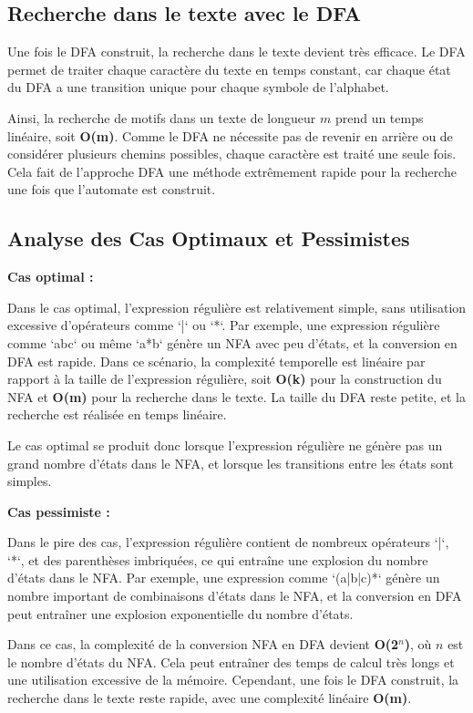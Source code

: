 \documentclass[11pt,english]{article}
\begin{document}
\subsection{Recherche dans le texte avec le DFA}

Une fois le DFA construit, la recherche dans le texte devient très efficace. Le DFA permet de traiter chaque caractère du texte en temps constant, car chaque état du DFA a une transition unique pour chaque symbole de l'alphabet.

Ainsi, la recherche de motifs dans un texte de longueur $m$ prend un temps linéaire, soit \textbf{O(m)}. Comme le DFA ne nécessite pas de revenir en arrière ou de considérer plusieurs chemins possibles, chaque caractère est traité une seule fois. Cela fait de l'approche DFA une méthode extrêmement rapide pour la recherche une fois que l'automate est construit.

\subsection{Analyse des Cas Optimaux et Pessimistes}

\textbf{Cas optimal :}

Dans le cas optimal, l'expression régulière est relativement simple, sans utilisation excessive d'opérateurs comme `|` ou `*`. Par exemple, une expression régulière comme `abc` ou même `a*b` génère un NFA avec peu d'états, et la conversion en DFA est rapide. Dans ce scénario, la complexité temporelle est linéaire par rapport à la taille de l'expression régulière, soit \textbf{O(k)} pour la construction du NFA et \textbf{O(m)} pour la recherche dans le texte. La taille du DFA reste petite, et la recherche est réalisée en temps linéaire.

Le cas optimal se produit donc lorsque l'expression régulière ne génère pas un grand nombre d'états dans le NFA, et lorsque les transitions entre les états sont simples.

\textbf{Cas pessimiste :}

Dans le pire des cas, l'expression régulière contient de nombreux opérateurs `|`, `*`, et des parenthèses imbriquées, ce qui entraîne une explosion du nombre d'états dans le NFA. Par exemple, une expression comme `(a|b|c)*` génère un nombre important de combinaisons d'états dans le NFA, et la conversion en DFA peut entraîner une explosion exponentielle du nombre d'états.

Dans ce cas, la complexité de la conversion NFA en DFA devient \textbf{O(2$^n$)}, où $n$ est le nombre d'états du NFA. Cela peut entraîner des temps de calcul très longs et une utilisation excessive de la mémoire. Cependant, une fois le DFA construit, la recherche dans le texte reste rapide, avec une complexité linéaire \textbf{O(m)}.
\end{document}
